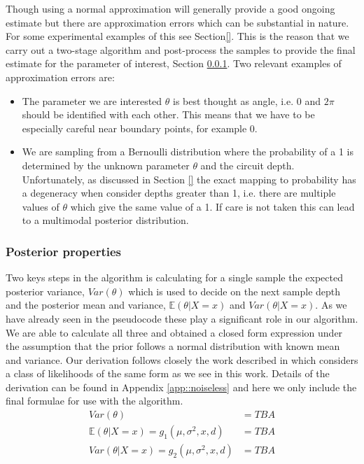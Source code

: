 Though using a normal approximation will generally provide a good ongoing estimate but there are approximation errors which can be substantial in nature. For some experimental examples of this see Section\ref{}. This is the reason that we carry out a two-stage algorithm and post-process the samples to provide the final estimate for the parameter of interest, Section \ref{sec::postprop}. Two relevant examples of approximation errors are:
\begin{itemize}
	\item The parameter we are interested $\theta$ is best thought as angle, i.e. $0$ and $2\pi$ should be identified with each other. This means that we have to be especially careful near boundary points, for example 0.
	\item We are sampling from a Bernoulli distribution where the probability of a 1 is determined by the unknown parameter $\theta$ and the circuit depth. Unfortunately, as discussed in Section \ref{} the exact mapping to probability has a degeneracy when consider depths greater than 1, i.e. there are multiple values of $\theta$ which give the same value of a 1. If care is not taken this can lead to a multimodal posterior distribution.
\end{itemize}

\subsubsection{Posterior properties}\label{sec::postprop}
Two keys steps in the algorithm is calculating for a single sample the expected posterior variance, $Var(\theta)$ which is used to decide on the next sample depth and the posterior mean and variance, $\mathbb{E}(\theta|X=x)$ and $Var(\theta|X=x)$. As we have already seen in the pseudocode these play a significant role in our algorithm. We are able to calculate all three and obtained a closed form expression under the assumption that the prior follows a normal distribution with known mean and variance. Our derivation follows closely the work described in \cite{} which considers a class of likelihoods of the same form as we see in this work. Details of the derivation can be found in Appendix \ref{app::noiseless} and here we only include the final formulae for use with the algorithm.
\begin{align}
Var(\theta) &= TBA \label{eqn::postvac}\\
 \mathbb{E}(\theta|X=x)= g_1(\mu,\sigma^2,x,d) &= TBA \label{eqn::mean}\\
 Var(\theta|X=x)=g_2(\mu,\sigma^2,x,d) &= TBA \label{eqn::var}
\end{align}

